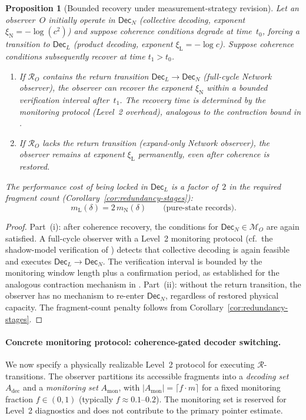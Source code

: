 \documentclass[11pt]{article}
\newcommand{\1}{\mathbf{1}}
\theoremstyle{definition}
\theoremstyle{plain}
\newtheorem{proposition}{Proposition}
\begin{document}
\begin{proposition}[Bounded recovery under measurement-strategy revision]
\label{prop:recovery-qd}
Let an observer~$O$ initially operate in $\mathsf{Dec}_N$ (collective
decoding, exponent $\xi_{\mathrm{N}}=-\log(c^2)$) and suppose
coherence conditions degrade at time~$t_0$, forcing a transition to
$\mathsf{Dec}_L$ (product decoding, exponent $\xi_{\mathrm{L}}=-\log c$).
Suppose coherence conditions subsequently recover at time $t_1>t_0$.
\begin{enumerate}[label=(\roman*)]
\item If $\mathcal{R}_O$ contains the return transition
  $\mathsf{Dec}_L\to\mathsf{Dec}_N$ (full-cycle Network observer), the
  observer can recover the exponent $\xi_{\mathrm{N}}$ within a bounded
  verification interval after~$t_1$.
  The recovery time is determined by the monitoring protocol (Level~2
  overhead), analogous to the contraction bound in
  \citep[Proposition~1(iii)]{WuDLNCompression2026preprint}.
\item If $\mathcal{R}_O$ lacks the return transition (expand-only Network
  observer), the observer remains at exponent $\xi_{\mathrm{L}}$
  permanently, even after coherence is restored.
\end{enumerate}
The performance cost of being locked in $\mathsf{Dec}_L$ is a factor of~$2$
in the required fragment count (Corollary~\ref{cor:redundancy-stages}):
\[
  m_{\mathrm{L}}(\delta) = 2\,m_{\mathrm{N}}(\delta)
  \qquad\text{(pure-state records).}
\]
\end{proposition}

\begin{proof}
Part~(i): after coherence recovery, the conditions for
$\mathsf{Dec}_N\in\mathcal{M}_O$ are again satisfied.
A full-cycle observer with a Level~2 monitoring protocol
(cf.\ the shadow-model verification of
\citep[Sec.~5.1]{WuDLNCompression2026preprint}) detects that collective
decoding is again feasible and executes
$\mathsf{Dec}_L\to\mathsf{Dec}_N$.
The verification interval is bounded by the monitoring window length plus
a confirmation period, as established for the analogous contraction
mechanism in
\citep[Proposition~1(iii)]{WuDLNCompression2026preprint}.
Part~(ii): without the return transition, the observer has no mechanism
to re-enter $\mathsf{Dec}_N$, regardless of restored physical capacity.
The fragment-count penalty follows from
Corollary~\ref{cor:redundancy-stages}.
\end{proof}


\paragraph{Concrete monitoring protocol: coherence-gated decoder switching.}
\label{par:monitoring-protocol}
We now specify a physically realizable Level~2 protocol for executing
$\mathcal{R}$-transitions.
The observer partitions its accessible fragments into a \emph{decoding
set} $A_{\mathrm{dec}}$ and a \emph{monitoring set}
$A_{\mathrm{mon}}$, with $|A_{\mathrm{mon}}|=\lceil f\cdot m\rceil$
for a fixed monitoring fraction $f\in(0,1)$ (typically $f\approx 0.1$--$0.2$).
The monitoring set is reserved for Level~2 diagnostics and does not
contribute to the primary pointer estimate.
\end{document}
